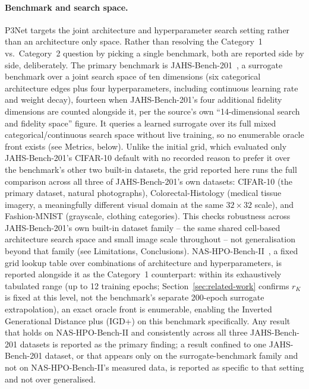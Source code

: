 \paragraph{Benchmark and search space.} P3Net targets the joint architecture and hyperparameter search
setting rather than an architecture only space. Rather than resolving the Category~1 vs.\ Category~2
question by picking a single benchmark, both are reported side by side, deliberately. The primary
benchmark is JAHS-Bench-201~\citep{bansal2022jahsbench}, a surrogate benchmark over a joint search space of
ten dimensions (six categorical architecture edges plus four hyperparameters, including continuous learning
rate and weight decay), fourteen when JAHS-Bench-201's four additional fidelity dimensions are counted
alongside it, per the source's own ``14-dimensional search and fidelity space'' figure. It queries a learned
surrogate over its full mixed categorical/continuous search space without live training, so no enumerable
oracle front exists (see Metrics, below). Unlike the initial grid, which evaluated only JAHS-Bench-201's
CIFAR-10 default with no recorded reason to prefer it over the benchmark's other two built-in datasets, the
grid reported here runs the full comparison across all three of JAHS-Bench-201's own datasets: CIFAR-10 (the
primary dataset, natural photographs), Colorectal-Histology (medical tissue imagery, a meaningfully
different visual domain at the same $32\times32$ scale), and Fashion-MNIST (grayscale, clothing categories).
This checks robustness across JAHS-Bench-201's own built-in dataset family -- the same shared cell-based
architecture search space and small image scale throughout -- not generalisation beyond that family (see
Limitations, Conclusions).
NAS-HPO-Bench-II~\citep{hirose2021nashpobenchii}, a fixed grid lookup table over combinations of
architecture and hyperparameters, is reported alongside it as the Category~1 counterpart: within its exhaustively tabulated range (up to 12 training epochs; Section~\ref{sec:related-work} confirms $r_K$ is fixed at this level, not the benchmark's separate 200-epoch surrogate extrapolation), an
exact oracle front is enumerable, enabling the Inverted Generational Distance plus (IGD+) on this benchmark specifically. Any result that holds on
NAS-HPO-Bench-II and consistently across all three JAHS-Bench-201 datasets is reported as the primary
finding; a result confined to one JAHS-Bench-201 dataset, or that appears only on the surrogate-benchmark
family and not on NAS-HPO-Bench-II's measured data, is reported as specific to that setting and not over
generalised.

